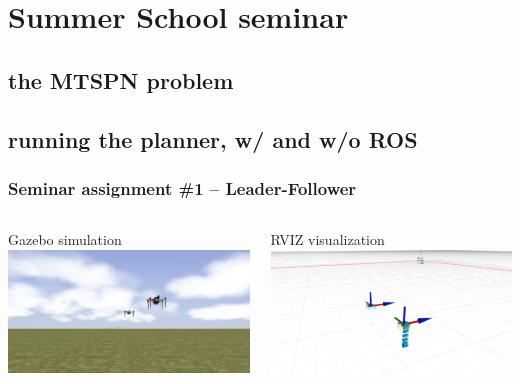 \documentclass[aspectratio=1610]{beamer}
\begin{document}

  \section{Summer School seminar}
  \subsection{the MTSPN problem}
  \subsection{running the planner, w/ and w/o ROS}


  \begin{frame}
    \frametitle{Seminar assignment \#1 -- Leader-Follower}

    \begin{columns}[c]


      \begin{block}{Gazebo simulation}
        \includegraphics[width=1.0\textwidth]{./fig/uvdar_task/gazebo_two_uavs.png}
      \end{block}


      \begin{block}{RVIZ visualization}
        \includegraphics[width=1.0\textwidth]{./fig/uvdar_task/rviz_two_uavs.png}
      \end{block}


\end{columns}
\end{frame}
\end{document}
